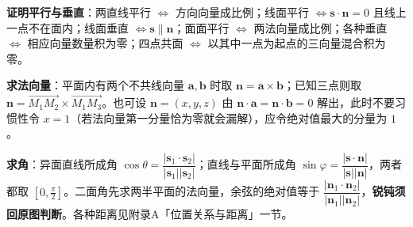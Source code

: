 \textbf{证明平行与垂直}：两直线平行 $\iff$ 方向向量成比例；线面平行 $\iff\boldsymbol{s}\cdot\boldsymbol{n}=0$ 且线上一点不在面内；线面垂直 $\iff\boldsymbol{s}\parallel\boldsymbol{n}$；面面平行 $\iff$ 两法向量成比例；各种垂直 $\iff$ 相应向量数量积为零；四点共面 $\iff$ 以其中一点为起点的三向量混合积为零。

\textbf{求法向量}：平面内有两个不共线向量 $\boldsymbol{a},\boldsymbol{b}$ 时取 $\boldsymbol{n}=\boldsymbol{a}\times\boldsymbol{b}$；已知三点则取 $\boldsymbol{n}=\overrightarrow{M_1M_2}\times\overrightarrow{M_1M_3}$。也可设 $\boldsymbol{n}=(x,y,z)$ 由 $\boldsymbol{n}\cdot\boldsymbol{a}=\boldsymbol{n}\cdot\boldsymbol{b}=0$ 解出，此时不要习惯性令 $x=1$（若法向量第一分量恰为零就会漏解），应令绝对值最大的分量为 $1$。

\textbf{求角}：异面直线所成角 $\cos\theta=\dfrac{|\boldsymbol{s}_1\cdot\boldsymbol{s}_2|}{|\boldsymbol{s}_1||\boldsymbol{s}_2|}$；直线与平面所成角 $\sin\varphi=\dfrac{|\boldsymbol{s}\cdot\boldsymbol{n}|}{|\boldsymbol{s}||\boldsymbol{n}|}$，两者都取 $\left[0,\frac{\pi}{2}\right]$。二面角先求两半平面的法向量，余弦的绝对值等于 $\dfrac{|\boldsymbol{n}_1\cdot\boldsymbol{n}_2|}{|\boldsymbol{n}_1||\boldsymbol{n}_2|}$，\textbf{锐钝须回原图判断}。各种距离见附录A「位置关系与距离」一节。

